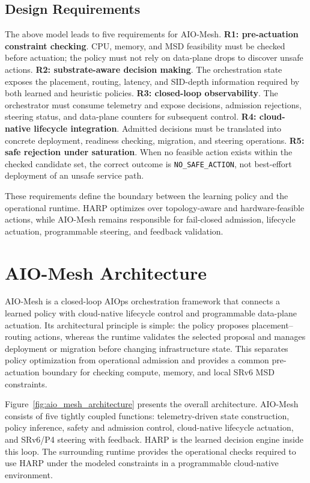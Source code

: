 \documentclass[final,5p]{elsarticle}
\newcommand{\rev}[1]{\textcolor{revisiongreen}{#1}}
\let\newrev\rev
\begin{document}
\subsection{Design Requirements}
\label{subsec:design_requirements}

The above model leads to five requirements for AIO-Mesh. \textbf{R1: pre-actuation constraint checking}. CPU, memory, and MSD feasibility must be checked before actuation; the policy must not rely on data-plane drops to discover unsafe actions. \newrev{\textbf{R2: substrate-aware decision making}. The orchestration state exposes the placement, routing, latency, and SID-depth information required by both learned and heuristic policies.} \textbf{R3: closed-loop observability}. The orchestrator must consume telemetry and expose decisions, admission rejections, steering status, and data-plane counters for subsequent control. \textbf{R4: cloud-native lifecycle integration}. Admitted decisions must be translated into concrete deployment, readiness checking, migration, and steering operations. \textbf{R5: safe rejection under saturation}. When no feasible action exists \rev{within the checked candidate set}, the correct outcome is \texttt{NO\_SAFE\_ACTION}, not best-effort deployment of an unsafe service path.

These requirements define the boundary between the learning policy and the operational runtime. HARP optimizes over topology-aware and hardware-feasible actions, while AIO-Mesh remains responsible for fail-closed admission, lifecycle actuation, programmable steering, and feedback validation.

\section{AIO-Mesh Architecture}
\label{sec:architecture}

AIO-Mesh is a closed-loop AIOps orchestration framework that connects a learned policy with cloud-native lifecycle control and programmable data-plane actuation. Its architectural principle is simple: \rev{the policy proposes placement--routing actions, whereas the runtime validates the selected proposal and manages deployment or migration before changing infrastructure state}. This separates policy optimization from operational admission and \rev{provides a common pre-actuation boundary for checking compute, memory, and local SRv6 MSD constraints}.

\newrev{Figure~\ref{fig:aio_mesh_architecture} presents the overall architecture.} AIO-Mesh consists of five tightly coupled functions: telemetry-driven state construction, policy inference, safety and admission control, cloud-native lifecycle actuation, and SRv6/P4 steering with feedback. HARP is the learned decision engine inside this loop. The surrounding runtime provides the operational \rev{checks} required to use HARP \rev{under the modeled constraints} in a programmable cloud-native environment.
\end{document}
